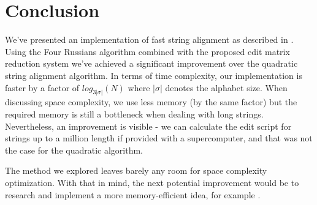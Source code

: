 \documentclass[times, utf8, seminar, numeric]{fer}
\begin{document}

\chapter{Conclusion}
We've presented an implementation of fast string alignment as described in \cite{masek1980faster}. Using the Four Russians algorithm combined with the proposed edit matrix reduction system we've achieved a significant improvement over the quadratic string alignment algorithm. In terms of time complexity, our implementation is faster by a factor of $log_{3|\sigma|}(N)$ where $|\sigma|$ denotes the alphabet size. When discussing space complexity, we use less memory (by the same factor) but the required memory is still a bottleneck when dealing with long strings. Nevertheless, an improvement is visible - we can calculate the edit script for strings up to a million length if provided with a supercomputer, and that was not the case for the quadratic algorithm.

The method we explored leaves barely any room for space complexity optimization. With that in mind, the next potential improvement would be to research and implement a more memory-efficient idea, for example \cite{kundeti2008extending}.




\nocite{*}
\end{document}
